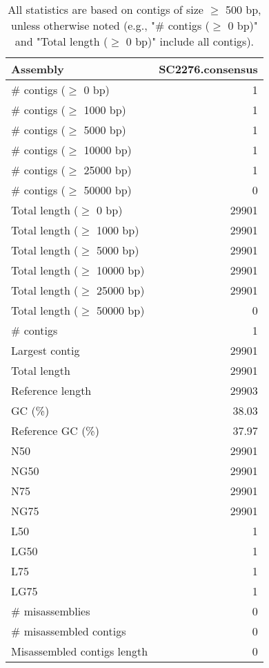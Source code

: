 \documentclass[12pt,a4paper]{article}
\begin{document}
\begin{table}[ht]
\begin{center}
\caption{All statistics are based on contigs of size $\geq$ 500 bp, unless otherwise noted (e.g., "\# contigs ($\geq$ 0 bp)" and "Total length ($\geq$ 0 bp)" include all contigs).}
\begin{tabular}{|l*{1}{|r}|}
\hline
Assembly & SC2276.consensus \\ \hline
\# contigs ($\geq$ 0 bp) & 1 \\ \hline
\# contigs ($\geq$ 1000 bp) & 1 \\ \hline
\# contigs ($\geq$ 5000 bp) & 1 \\ \hline
\# contigs ($\geq$ 10000 bp) & 1 \\ \hline
\# contigs ($\geq$ 25000 bp) & 1 \\ \hline
\# contigs ($\geq$ 50000 bp) & 0 \\ \hline
Total length ($\geq$ 0 bp) & 29901 \\ \hline
Total length ($\geq$ 1000 bp) & 29901 \\ \hline
Total length ($\geq$ 5000 bp) & 29901 \\ \hline
Total length ($\geq$ 10000 bp) & 29901 \\ \hline
Total length ($\geq$ 25000 bp) & 29901 \\ \hline
Total length ($\geq$ 50000 bp) & 0 \\ \hline
\# contigs & 1 \\ \hline
Largest contig & 29901 \\ \hline
Total length & 29901 \\ \hline
Reference length & 29903 \\ \hline
GC (\%) & 38.03 \\ \hline
Reference GC (\%) & 37.97 \\ \hline
N50 & 29901 \\ \hline
NG50 & 29901 \\ \hline
N75 & 29901 \\ \hline
NG75 & 29901 \\ \hline
L50 & 1 \\ \hline
LG50 & 1 \\ \hline
L75 & 1 \\ \hline
LG75 & 1 \\ \hline
\# misassemblies & 0 \\ \hline
\# misassembled contigs & 0 \\ \hline
Misassembled contigs length & 0 \\ \hline

\end{tabular}
\end{center}
\end{table}
\end{document}
